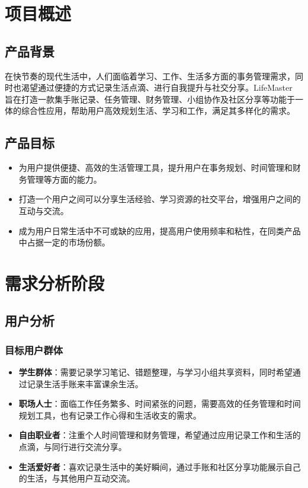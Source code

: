 \documentclass[a4paper]{article}
\begin{document}
\section{项目概述}

\subsection{产品背景}

在快节奏的现代生活中，人们面临着学习、工作、生活多方面的事务管理需求，同时也渴望通过便捷的方式记录生活点滴、进行自我提升与社交分享。LifeMaster 旨在打造一款集手账记录、任务管理、财务管理、小组协作及社区分享等功能于一体的综合性应用，帮助用户高效规划生活、学习和工作，满足其多样化的需求。

\subsection{产品目标}

\begin{itemize}
    \item 为用户提供便捷、高效的生活管理工具，提升用户在事务规划、时间管理和财务管理等方面的能力。
    \item 打造一个用户之间可以分享生活经验、学习资源的社交平台，增强用户之间的互动与交流。
    \item 成为用户日常生活中不可或缺的应用，提高用户使用频率和粘性，在同类产品中占据一定的市场份额。
\end{itemize}

\section{需求分析阶段}

\subsection{用户分析}

\subsubsection{目标用户群体}

\begin{itemize}
    \item \textbf{学生群体}：需要记录学习笔记、错题整理，与学习小组共享资料，同时希望通过记录生活手账来丰富课余生活。
    \item \textbf{职场人士}：面临工作任务繁多、时间紧张的问题，需要高效的任务管理和时间规划工具，也有记录工作心得和生活收支的需求。
    \item \textbf{自由职业者}：注重个人时间管理和财务管理，希望通过应用记录工作和生活的点滴，与同行进行交流分享。
    \item \textbf{生活爱好者}：喜欢记录生活中的美好瞬间，通过手账和社区分享功能展示自己的生活，与其他用户互动交流。
\end{itemize}
\end{document}
